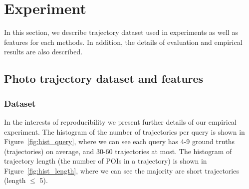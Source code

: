 %


\section{Experiment}

In this section, we describe trajectory dataset used in experiments as well as features for each methods.
In addition, the details of evaluation and empirical results are also described.

\subsection{Photo trajectory dataset and features}
\label{sec:feature}

\subsubsection{Dataset}
In the interests of reproducibility we present further details of our empirical experiment.
The histogram of the number of trajectories per query is shown in Figure~\ref{fig:hist_query},
where we can see each query has 4-9 ground truths (\ie trajectories) on average, and 30-60 trajectories at most.
The histogram of trajectory length (\ie the number of POIs in a trajectory) is shown in Figure~\ref{fig:hist_length},
where we can see the majority are short trajectories (\ie length $\le$ 5).



